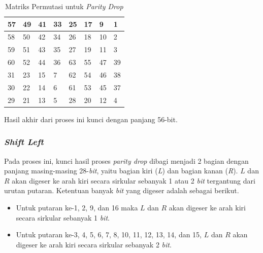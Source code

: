 \begin{table}[H]
	\begin{center}
		\caption{Matriks Permutasi untuk \textit{Parity Drop}}\label{table:parity_drop}
		\begin{tabular}{|l|l|l|l|l|l|l|l|}
				\hline
				57	&	49	&	41	&	33	&	25	&	17	&	9		&	1		\\ \hline
				58	&	50	&	42	&	34	&	26	&	18	&	10	&	2		\\ \hline
				59	&	51	&	43	&	35	&	27	&	19	&	11	&	3		\\ \hline
				60	&	52	&	44	&	36	&	63	&	55	&	47	&	39	\\ \hline
				31	&	23	&	15	&	7		&	62	&	54	&	46	&	38	\\ \hline
				30	&	22	&	14	&	6		&	61	&	53	&	45	&	37	\\ \hline
				29	&	21	&	13	&	5		&	28	&	20	&	12	&	4		\\ \hline
		\end{tabular}
	\end{center}
\end{table}

Hasil akhir dari proses ini kunci dengan panjang 56-bit.

\subsubsection{\textit{Shift Left}}

Pada proses ini, kunci hasil proses \textit{parity drop} dibagi menjadi 2 bagian dengan panjang masing-masing 28-\textit{bit}, yaitu bagian kiri (\textit{L}) dan bagian kanan (\textit{R}). \begin{math}L\end{math} dan \begin{math}R\end{math} akan digeser ke arah kiri secara sirkular sebanyak 1 atau 2 \textit{bit} tergantung dari urutan putaran. Ketentuan banyak \textit{bit} yang digeser adalah sebagai berikut.

\begin{itemize}
	\item Untuk putaran ke-1, 2, 9, dan 16 maka \begin{math}L\end{math} dan \begin{math}R\end{math} akan digeser ke arah kiri secara sirkular sebanyak 1 \textit{bit}.
	\item Untuk putaran ke-3, 4, 5, 6, 7, 8, 10, 11, 12, 13, 14, dan 15, \begin{math}L\end{math} dan \begin{math}R\end{math} akan digeser ke arah kiri secara sirkular sebanyak 2 \textit{bit}.
\end{itemize}

